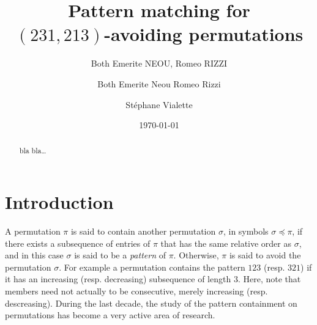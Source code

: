 \documentclass[a4paper]{llncs}
\begin{document}

\title{Pattern matching for\\ $(231,213)$-avoiding permutations}
\author{Both Emerite NEOU, Romeo RIZZI}
\date{}

\author{%
	Both Emerite Neou
  Romeo Rizzi \and
  St\'ephane Vialette
}%

\date{\today}

\maketitle

\begin{abstract}
bla bla\ldots
\end{abstract}



\section{Introduction}
\label{section:Introduction}

	A permutation $\pi$ is said to contain another permutation $\sigma$,
	in symbols $\sigma \preceq \pi$,
	if there exists a subsequence of entries of $\pi$ that has the same relative
	order as $\sigma$, and in this case $\sigma$ is said to be a 
	\emph{pattern} of $\pi$.
	Otherwise, $\pi$ is said to avoid the permutation $\sigma$.
	For example a permutation contains the pattern $123$ (resp. $321$) if it has
	an increasing (resp. decreasing) subsequence of length $3$.
	Here, note that members need not actually to be consecutive, 
	merely increasing (resp. descreasing).
	During the last decade, the study of the pattern containment on permutations has
	become a very active area of research.
\end{document}
